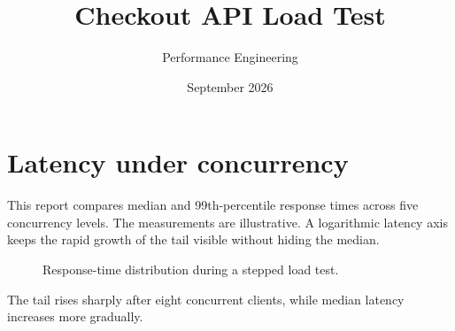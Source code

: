 \documentclass{article}
\title{Checkout API Load Test}
\author{Performance Engineering}
\date{September 2026}
\begin{document}
\maketitle

\section{Latency under concurrency}
This report compares median and 99th-percentile response times across five
concurrency levels. The measurements are illustrative. A logarithmic latency
axis keeps the rapid growth of the tail visible without hiding the median.

\begin{figure}
\centering
{}
\caption{Response-time distribution during a stepped load test.}
\label{fig:latency}
\end{figure}

The tail rises sharply after eight concurrent clients, while median latency
increases more gradually.
\end{document}
